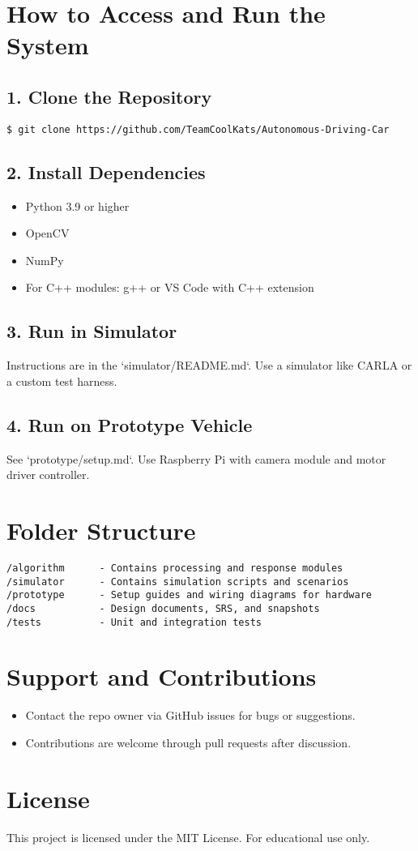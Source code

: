 \documentclass[12pt]{article}
\begin{document}
\section{How to Access and Run the System}
\subsection*{1. Clone the Repository}
\begin{verbatim}
$ git clone https://github.com/TeamCoolKats/Autonomous-Driving-Car
\end{verbatim}

\subsection*{2. Install Dependencies}
\begin{itemize}
  \item Python 3.9 or higher
  \item OpenCV
  \item NumPy
  \item For C++ modules: g++ or VS Code with C++ extension
\end{itemize}

\subsection*{3. Run in Simulator}
Instructions are in the `simulator/README.md`. Use a simulator like CARLA or a custom test harness.

\subsection*{4. Run on Prototype Vehicle}
See `prototype/setup.md`. Use Raspberry Pi with camera module and motor driver controller.

\section{Folder Structure}
\begin{verbatim}
/algorithm      - Contains processing and response modules
/simulator      - Contains simulation scripts and scenarios
/prototype      - Setup guides and wiring diagrams for hardware
/docs           - Design documents, SRS, and snapshots
/tests          - Unit and integration tests
\end{verbatim}

\section{Support and Contributions}
\begin{itemize}
  \item Contact the repo owner via GitHub issues for bugs or suggestions.
  \item Contributions are welcome through pull requests after discussion.
\end{itemize}

\section{License}
This project is licensed under the MIT License. For educational use only.
\end{document}
